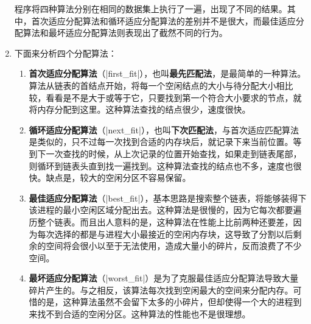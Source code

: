 \documentclass[c5size,a4paper,nofonts]{ctexart}
\begin{document}
\begin{enumerate}

程序将四种算法分别在相同的数据集上执行了一遍，出现了不同的结果。其中，首次适应分配算法和循环适应分配算法的差别并不是很大，而最佳适应分配算法和最坏适应分配算法则表现出了截然不同的行为。

\item 下面来分析四个分配算法：
\begin{enumerate}
\item {\bf 首次适应分配算法}（|first_fit|），也叫{\bf 最先匹配法}，是最简单的一种算法。算法从链表的首结点开始，将每一个空闲结点的大小与待分配大小相比较，看看是不是大于或等于它，只要找到第一个符合大小要求的节点，就将内存分配到这里。这种算法查找的结点很少，速度很快。
\item {\bf 循环适应分配算法}（|next_fit|），也叫{\bf 下次匹配法}，与首次适应匹配算法是类似的，只不过每一次找到合适的内存块后，就记录下来当前位置。等到下一次查找的时候，从上次记录的位置开始查找，如果走到链表尾部，则循环到链表头直到找一遍找到。这种算法查找的结点也不多，速度也很快。缺点是，较大的空闲分区不容易保留。
\item {\bf 最佳适应分配算法}（|best_fit|），基本思路是搜索整个链表，将能够装得下该进程的最小空闲区域分配出去。这种算法是很慢的，因为它每次都要遍历整个链表。而且出人意料的是，这种算法在性能上比前两种还要差，因为每次选择的都是与进程大小最接近的空闲内存块，这导致了分割以后剩余的空间将会很小以至于无法使用，造成大量小的碎片，反而浪费了不少空间。
\item {\bf 最坏适应分配算法}（|worst_fit|）是为了克服最佳适应分配算法导致大量碎片产生的。与之相反，该算法每次找到空闲最大的空间来分配内存。可惜的是，这种算法虽然不会留下太多的小碎片，但却使得一个大的进程到来找不到合适的空闲分区。这种算法的性能也不是很理想。
\end{enumerate}

\end{enumerate}
\end{document}
